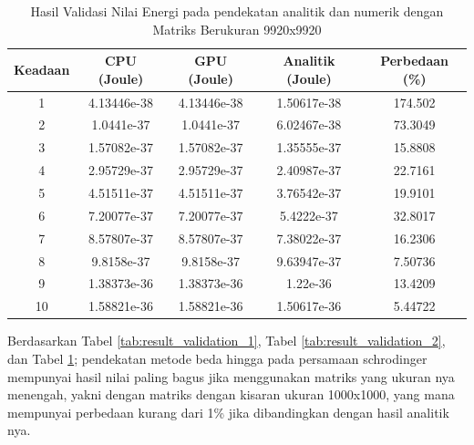 \begin{table}[H]
	\centering
	\caption{Hasil Validasi Nilai Energi pada pendekatan analitik dan numerik dengan Matriks Berukuran 9920x9920}
	\label{tab:result_validation_3}
	\begin{tabular}{|c|c|c|c|c|}
		\hline
		\textbf{Keadaan} & \textbf{CPU (Joule)} & \textbf{GPU (Joule)} & \textbf{Analitik (Joule)} & \textbf{Perbedaan (\%)} \\
		\hline
		1                & 4.13446e-38          & 4.13446e-38          & 1.50617e-38               & 174.502                 \\
		2                & 1.0441e-37           & 1.0441e-37           & 6.02467e-38               & 73.3049                 \\
		3                & 1.57082e-37          & 1.57082e-37          & 1.35555e-37               & 15.8808                 \\
		4                & 2.95729e-37          & 2.95729e-37          & 2.40987e-37               & 22.7161                 \\
		5                & 4.51511e-37          & 4.51511e-37          & 3.76542e-37               & 19.9101                 \\
		6                & 7.20077e-37          & 7.20077e-37          & 5.4222e-37                & 32.8017                 \\
		7                & 8.57807e-37          & 8.57807e-37          & 7.38022e-37               & 16.2306                 \\
		8                & 9.8158e-37           & 9.8158e-37           & 9.63947e-37               & 7.50736                 \\
		9                & 1.38373e-36          & 1.38373e-36          & 1.22e-36                  & 13.4209                 \\
		10               & 1.58821e-36          & 1.58821e-36          & 1.50617e-36               & 5.44722                 \\
		\hline
	\end{tabular}
\end{table}

Berdasarkan Tabel \ref{tab:result_validation_1}, Tabel \ref{tab:result_validation_2}, dan Tabel \ref{tab:result_validation_3}; pendekatan metode beda hingga pada persamaan schrodinger mempunyai hasil nilai paling bagus jika menggunakan matriks yang ukuran nya menengah, yakni dengan matriks dengan kisaran ukuran 1000x1000, yang mana mempunyai perbedaan kurang dari 1\% jika dibandingkan dengan hasil analitik nya.

